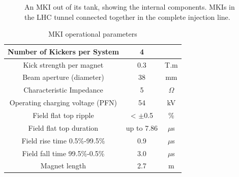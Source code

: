 \begin{figure}
\begin{center}
\end{center}
\caption{ An MKI out of its tank, showing the internal components.  MKIs in the LHC tunnel connected together in the complete injection line.}
\label{fig:lhc-mki-cross-section}
\end{figure}

\begin{table}
\caption{MKI operational parameters}

\begin{center}
\begin{tabular}{c | c | c}
Number of Kickers per System & 4 & \\ \hline
Kick strength per magnet & 0.3 & T.m \\ \hline
Beam aperture (diameter) & 38 & mm \\ \hline
Characteristic Impedance & 5 & $\Omega$ \\ \hline
Operating charging voltage (PFN) & 54 & kV \\ \hline
Field flat top ripple & < $\pm$0.5 & \% \\ \hline
Field flat top duration & up to 7.86 & $\mu$s \\ \hline
Field rise time 0.5\%-99.5\% & 0.9 & $\mu$s \\ \hline
Field fall time 99.5\%-0.5\% & 3.0 & $\mu$s \\ \hline
Magnet length & 2.7 & m \\ 
\end{tabular}
\end{center}
\label{tab:mki-parameters}
\end{table}